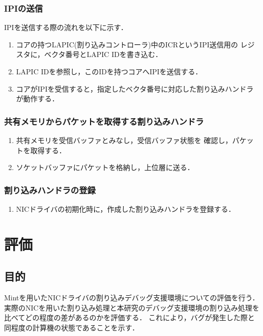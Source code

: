 \documentclass[tanilab-enum]{graduate}
\begin{document}
\subsection{IPIの送信}
IPIを送信する際の流れを以下に示す．
\begin{enumerate}
    \item コアの持つLAPIC(割り込みコントローラ)中のICRというIPI送信用の
        レジスタに，ベクタ番号とLAPIC IDを書き込む．
    \item LAPIC IDを参照し，このIDを持つコアへIPIを送信する．
    \item コアがIPIを受信すると，指定したベクタ番号に対応した割り込みハンドラが動作する．
\end{enumerate}
\subsection{共有メモリからパケットを取得する割り込みハンドラ}
\begin{enumerate}
    \item 共有メモリを受信バッファとみなし，受信バッファ状態を
        確認し，パケットを取得する．
    \item ソケットバッファにパケットを格納し，上位層に送る．
\end{enumerate}
\subsection{割り込みハンドラの登録}
\begin{enumerate}
    \item NICドライバの初期化時に，作成した割り込みハンドラを登録する．
\end{enumerate}
\chapter{評価}\label{estimaion}
\section{目的}
Mintを用いたNICドライバの割り込みデバッグ支援環境についての評価を行う．
実際のNICを用いた割り込み処理と本研究のデバッグ支援環境の割り込み処理を
比べてどの程度の差があるのかを評価する．
これにより，バグが発生した際と同程度の計算機の状態であることを示す．
\end{document}
